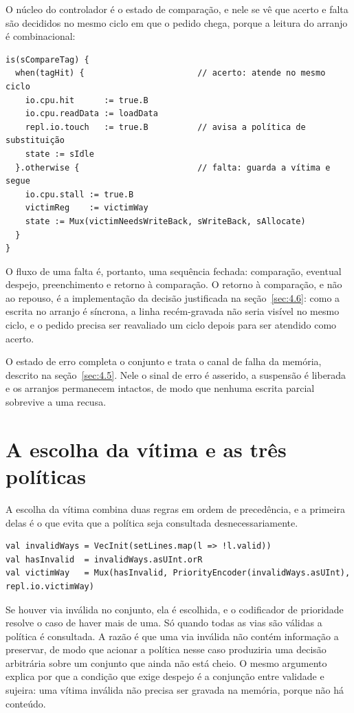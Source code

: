 O núcleo do controlador é o estado de comparação, e nele se vê que acerto e falta são decididos no mesmo ciclo em que o pedido chega, porque a leitura do arranjo é combinacional:


{\footnotesize
\begin{verbatim}
is(sCompareTag) {
  when(tagHit) {                       // acerto: atende no mesmo ciclo
    io.cpu.hit      := true.B
    io.cpu.readData := loadData
    repl.io.touch   := true.B          // avisa a política de substituição
    state := sIdle
  }.otherwise {                        // falta: guarda a vítima e segue
    io.cpu.stall := true.B
    victimReg    := victimWay
    state := Mux(victimNeedsWriteBack, sWriteBack, sAllocate)
  }
}
\end{verbatim}
}


O fluxo de uma falta é, portanto, uma sequência fechada: comparação, eventual despejo, preenchimento e retorno à comparação. O retorno à comparação, e não ao repouso, é a implementação da decisão justificada na seção~\ref{sec:4.6}: como a escrita no arranjo é síncrona, a linha recém-gravada não seria visível no mesmo ciclo, e o pedido precisa ser reavaliado um ciclo depois para ser atendido como acerto.

O estado de erro completa o conjunto e trata o canal de falha da memória, descrito na seção~\ref{sec:4.5}. Nele o sinal de erro é asserido, a suspensão é liberada e os arranjos permanecem intactos, de modo que nenhuma escrita parcial sobrevive a uma recusa.

\section{A escolha da vítima e as três políticas}\label{sec:5.6}

A escolha da vítima combina duas regras em ordem de precedência, e a primeira delas é o que evita que a política seja consultada desnecessariamente.


{\footnotesize
\begin{verbatim}
val invalidWays = VecInit(setLines.map(l => !l.valid))
val hasInvalid  = invalidWays.asUInt.orR
val victimWay   = Mux(hasInvalid, PriorityEncoder(invalidWays.asUInt), repl.io.victimWay)
\end{verbatim}
}


Se houver via inválida no conjunto, ela é escolhida, e o codificador de prioridade resolve o caso de haver mais de uma. Só quando todas as vias são válidas a política é consultada. A razão é que uma via inválida não contém informação a preservar, de modo que acionar a política nesse caso produziria uma decisão arbitrária sobre um conjunto que ainda não está cheio. O mesmo argumento explica por que a condição que exige despejo é a conjunção entre validade e sujeira: uma vítima inválida não precisa ser gravada na memória, porque não há conteúdo.

